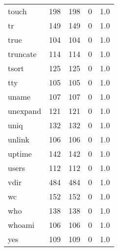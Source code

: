 \begin{tabular}{lrrrr}
touch     &                     198 &              198 &                 0 &                          1.0 \\
tr        &                     149 &              149 &                 0 &                          1.0 \\
true      &                     104 &              104 &                 0 &                          1.0 \\
truncate  &                     114 &              114 &                 0 &                          1.0 \\
tsort     &                     125 &              125 &                 0 &                          1.0 \\
tty       &                     105 &              105 &                 0 &                          1.0 \\
uname     &                     107 &              107 &                 0 &                          1.0 \\
unexpand  &                     121 &              121 &                 0 &                          1.0 \\
uniq      &                     132 &              132 &                 0 &                          1.0 \\
unlink    &                     106 &              106 &                 0 &                          1.0 \\
uptime    &                     142 &              142 &                 0 &                          1.0 \\
users     &                     112 &              112 &                 0 &                          1.0 \\
vdir      &                     484 &              484 &                 0 &                          1.0 \\
wc        &                     152 &              152 &                 0 &                          1.0 \\
who       &                     138 &              138 &                 0 &                          1.0 \\
whoami    &                     106 &              106 &                 0 &                          1.0 \\
yes       &                     109 &              109 &                 0 &                          1.0 \\
\bottomrule
\end{tabular}
